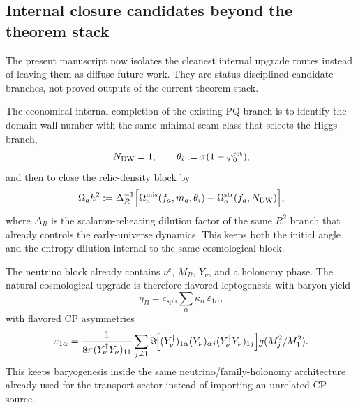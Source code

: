 \subsection{Internal closure candidates beyond the theorem stack}

The present manuscript now isolates the cleanest internal upgrade routes instead of leaving them as diffuse future work. They are status-disciplined candidate branches, not proved outputs of the current theorem stack.

\begin{remark}
The economical internal completion of the existing PQ branch is to identify the
domain-wall number with the same minimal seam class that selects the Higgs branch,
\[
N_{\mathrm{DW}}=1,
\qquad
\theta_i:=\pi(1-\varphi_0^{\mathrm{ret}}),
\]
and then to close the relic-density block by
\[
\Omega_a h^2
:=
\Delta_R^{-1}
\Bigl[
\Omega_a^{\mathrm{mis}}(f_a,m_a,\theta_i)
+
\Omega_a^{\mathrm{str}}(f_a,N_{\mathrm{DW}})
\Bigr],
\]
where $\Delta_R$ is the scalaron-reheating dilution factor of the same $R^2$
branch that already controls the early-universe dynamics. This keeps both the
initial angle and the entropy dilution internal to the same cosmological block.
\end{remark}

\begin{remark}
The neutrino block already contains $\nu^c$, $M_R$, $Y_\nu$, and a holonomy phase.
The natural cosmological upgrade is therefore flavored leptogenesis with baryon yield
\[
\eta_B
=
c_{\mathrm{sph}}
\sum_\alpha
\kappa_\alpha\,\varepsilon_{1\alpha},
\]
with flavored CP asymmetries
\[
\varepsilon_{1\alpha}
=
\frac{1}{8\pi (Y_\nu^\dagger Y_\nu)_{11}}
\sum_{j\neq 1}
\Im\!\Bigl[
(Y_\nu^\dagger)_{1\alpha}(Y_\nu)_{\alpha j}(Y_\nu^\dagger Y_\nu)_{1j}
\Bigr]
g(M_j^2/M_1^2).
\]
This keeps baryogenesis inside the same neutrino/family-holonomy architecture
already used for the transport sector instead of importing an unrelated CP source.
\end{remark}

